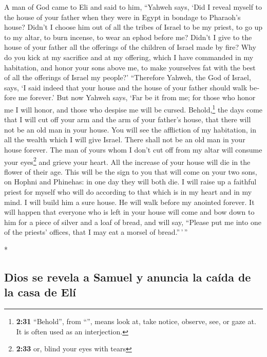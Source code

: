 \begin{paracol}{2}
\begin{otherlanguage}{english}
 A man of God came to Eli and said to him, ``Yahweh says,
`Did I reveal myself to the house of your father when they were in Egypt
in bondage to Pharaoh's house?  Didn't I choose him out
of all the tribes of Israel to be my priest, to go up to my altar, to
burn incense, to wear an ephod before me? Didn't I give to the house of
your father all the offerings of the children of Israel made by fire?
 Why do you kick at my sacrifice and at my offering,
which I have commanded in my habitation, and honor your sons above me,
to make yourselves fat with the best of all the offerings of Israel my
people?'  ``Therefore Yahweh, the God of Israel, says, `I
said indeed that your house and the house of your father should walk
before me forever.' But now Yahweh says, `Far be it from me; for those
who honor me I will honor, and those who despise me will be cursed.
 Behold,\footnote{\textbf{2:31} ``Behold'', from
  ``'', means look at, take notice, observe, see, or gaze
  at. It is often used as an interjection.} the days come that I will
cut off your arm and the arm of your father's house, that there will not
be an old man in your house.  You will see the affliction
of my habitation, in all the wealth which I will give Israel. There
shall not be an old man in your house forever.  The man
of yours whom I don't cut off from my altar will consume your
eyes\footnote{\textbf{2:33} or, blind your eyes with tears} and grieve
your heart. All the increase of your house will die in the flower of
their age.  This will be the sign to you that will come
on your two sons, on Hophni and Phinehas: in one day they will both die.
 I will raise up a faithful priest for myself who will do
according to that which is in my heart and in my mind. I will build him
a sure house. He will walk before my anointed forever. 
It will happen that everyone who is left in your house will come and bow
down to him for a piece of silver and a loaf of bread, and will say,
``Please put me into one of the priests' offices, that I may eat a
morsel of bread.''\,'\,''

\end{otherlanguage}

\switchcolumn[0]*

\hypertarget{dios-se-revela-a-samuel-y-anuncia-la-cauxedda-de-la-casa-de-eluxed}{%
\subsection{Dios se revela a Samuel y anuncia la caída de la casa de
Elí}\label{dios-se-revela-a-samuel-y-anuncia-la-cauxedda-de-la-casa-de-eluxed}}


\end{paracol}
